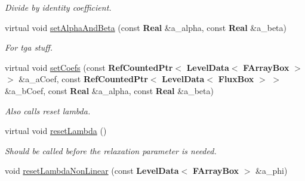 \begin{Indent}
\begin{DoxyCompactItemize}
\begin{DoxyCompactList}\small\item\em Divide by identity coefficient. \end{DoxyCompactList}\item 
\mbox{\label{class_a_m_r_non_linear_multi_comp_op_a78c046aa738c5edede492bf14ef913de}} 
virtual void \hyperlink{class_a_m_r_non_linear_multi_comp_op_a78c046aa738c5edede492bf14ef913de}{set\+Alpha\+And\+Beta} (const \textbf{ Real} \&a\+\_\+alpha, const \textbf{ Real} \&a\+\_\+beta)
\begin{DoxyCompactList}\small\item\em For tga stuff. \end{DoxyCompactList}\item 
\mbox{\label{class_a_m_r_non_linear_multi_comp_op_a6029b152d2e8faddbf820f188cb73c01}} 
virtual void \hyperlink{class_a_m_r_non_linear_multi_comp_op_a6029b152d2e8faddbf820f188cb73c01}{set\+Coefs} (const \textbf{ Ref\+Counted\+Ptr}$<$ \textbf{ Level\+Data}$<$ \textbf{ F\+Array\+Box} $>$ $>$ \&a\+\_\+a\+Coef, const \textbf{ Ref\+Counted\+Ptr}$<$ \textbf{ Level\+Data}$<$ \textbf{ Flux\+Box} $>$ $>$ \&a\+\_\+b\+Coef, const \textbf{ Real} \&a\+\_\+alpha, const \textbf{ Real} \&a\+\_\+beta)
\begin{DoxyCompactList}\small\item\em Also calls reset lambda. \end{DoxyCompactList}\item 
\mbox{\label{class_a_m_r_non_linear_multi_comp_op_aa558902d2bd88e41dff404c6b3ae206f}} 
virtual void \hyperlink{class_a_m_r_non_linear_multi_comp_op_aa558902d2bd88e41dff404c6b3ae206f}{reset\+Lambda} ()
\begin{DoxyCompactList}\small\item\em Should be called before the relaxation parameter is needed. \end{DoxyCompactList}\item 
\mbox{\label{class_a_m_r_non_linear_multi_comp_op_ad3c8e757a15bb3fdfa03c7b0c05315df}} 
void \hyperlink{class_a_m_r_non_linear_multi_comp_op_ad3c8e757a15bb3fdfa03c7b0c05315df}{reset\+Lambda\+Non\+Linear} (const \textbf{ Level\+Data}$<$ \textbf{ F\+Array\+Box} $>$ \&a\+\_\+phi)

\end{DoxyCompactItemize}
\end{Indent}

